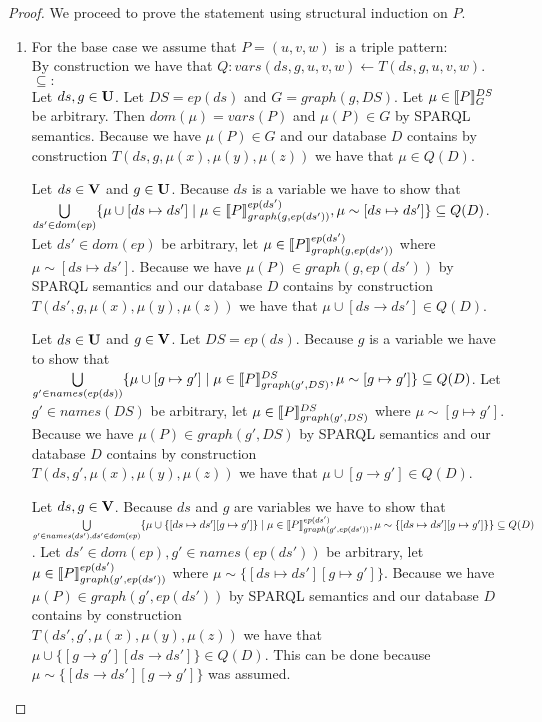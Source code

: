 \begin{proof}
	We proceed to prove the statement using structural induction on $P$.
	\noindent 
	\begin{enumerate}
		\item  For the base case we assume that $P=(u,v,w)$ is a triple pattern:\\
			By construction we have that $Q: vars(ds,g,u,v,w) \leftarrow
			T(ds,g,u,v,w)$.\\
			$\subseteq:$\\

			Let $ds,g \in \mathbf{U}$. Let $DS = ep(ds)$ and $G = graph(g,DS)$.
			Let $\mu \in \llbracket P \rrbracket^{DS}_{G}$ be arbitrary. 
			Then $dom(\mu) = vars(P)$ and $\mu(P) \in G$ by SPARQL semantics. 
			Because we have $\mu(P) \in G$ and our database $D$ contains by
			construction $T(ds,g,\mu(x),\mu(y),\mu(z))$ we have that $\mu \in Q(D)$.

			\bigskip\noindent
			Let $ds \in \mathbf{V}$ and $g \in \mathbf{U}$. 
			Because $ds$ is a variable we have to show that 
			$\bigcup\limits_{ds' \in dom(ep)} \{ \mu \cup [ds \mapsto ds'] \mid \mu \in \llbracket P
			\rrbracket^{ep(ds')}_{graph(g,ep(ds'))},\mu \sim [ds \mapsto ds']\} \subseteq Q(D)$. 
			Let $ds' \in dom(ep)$ be arbitrary, let $\mu \in \llbracket P
			\rrbracket^{ep(ds')}_{graph(g,ep(ds'))}$ where $\mu \sim [ds \mapsto ds']$.
			Because we have $\mu(P) \in graph(g,ep(ds'))$ by SPARQL semantics and our database
			$D$ contains by construction\\ $T(ds',g,\mu(x),\mu(y),\mu(z))$ we have that
			$\mu \cup [ds \rightarrow ds'] \in Q(D)$. 

			\bigskip\noindent
			Let $ds \in \mathbf{U}$ and $g \in \mathbf{V}$. Let $DS = ep(ds)$. 
			Because $g$ is a variable we have to show that 
			$\bigcup\limits_{g' \in names(ep(ds))} \{ \mu \cup [g \mapsto g'] \mid \mu \in \llbracket P
			\rrbracket^{DS}_{graph(g',DS)},\mu \sim [g \mapsto g']\} \subseteq Q(D)$.
			Let $g' \in names(DS)$ be arbitrary, let $\mu \in \llbracket P
			\rrbracket^{DS}_{graph(g',DS)}$ where $\mu \sim [g \mapsto g']$.
			Because we have $\mu(P) \in graph(g',DS)$ by SPARQL semantics and our database
			$D$ contains by construction\\ 
			$T(ds,g',\mu(x),\mu(y),\mu(z))$ we have that $\mu \cup [g
			\rightarrow g'] \in Q(D)$. 

			\bigskip\noindent
			Let $ds,g \in \mathbf{V}$.
			Because $ds$ and $g$ are variables we have to show that \\
			$\bigcup\limits_{g' \in names(ds'), ds'\in dom(ep)} \{ \mu \cup \{[ds\mapsto ds'] [g
				\mapsto g']\} \mid \mu \in \llbracket P
				\rrbracket^{ep(ds')}_{graph(g',ep(ds'))},\mu 
			\sim \{[ds \mapsto ds'][g \mapsto g']\}\} \subseteq Q(D)$. 
			Let $ds'\in dom(ep), g' \in names(ep(ds'))$ be arbitrary, let $\mu \in \llbracket P
			\rrbracket^{ep(ds')}_{graph(g',ep(ds'))}$ where $\mu \sim \{[ds\mapsto ds'][g \mapsto
			g'] \}$.
			Because we have $\mu(P) \in graph(g',ep(ds'))$ by SPARQL semantics and our database
			$D$ contains by construction\\ $T(ds',g',\mu(x),\mu(y),\mu(z))$ we have that
			$\mu \cup \{[g \rightarrow g'][ds \rightarrow ds'] \}\in Q(D)$. 
			This can be done because $\mu 
			\sim \{[ds \rightarrow ds'][g \rightarrow g']\}$ was assumed. 


\end{enumerate}
\end{proof}
